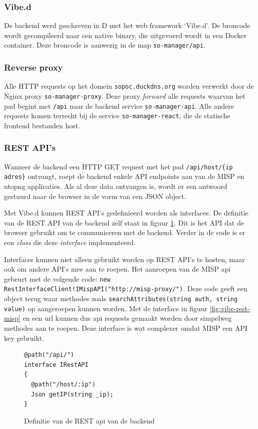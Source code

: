 \documentclass[a4paper,12pt]{report}
\begin{document}
\subsubsection{Vibe.d}
De backend werd geschreven in D met het web framework `Vibe.d'.
De broncode wordt gecompileerd naar een native binary, die uitgevoerd wordt in een Docker container.
Deze broncode is aanwezig in de map \lstinline|so-manager/api|.

\subsubsection{Reverse proxy}
Alle HTTP requests op het domein \lstinline|sopoc.duckdns.org| worden verwerkt door de Nginx proxy \lstinline|so-manager-proxy|.
Deze proxy \emph{forward} alle requests waarvan het pad begint met \lstinline|/api| naar de backend service \lstinline|so-manager-api|.
Alle andere requests komen terrecht bij de service \lstinline|so-manager-react|, die de statische frontend bestanden host.

\subsubsection{REST API's}
Wanneer de backend een HTTP GET request met het pad \lstinline|/api/host/{ip adres}| ontvangt, roept de backend enkele API endpoints aan van de MISP en ntopng applicaties.
Als al deze data ontvangen is, wordt er een antwoord gestuurd naar de browser in de vorm van een JSON object.

Met Vibe.d kunnen REST API's gedefinieerd worden als interfaces.
De definitie van de REST API van de backend zelf staat in figuur \ref{fig:vibe-rest-server}.
Dit is het API dat de browser gebruikt om te communiceren met de backend.
Verder in de code is er een \emph{class} die deze \emph{interface} implementeerd.

Interfaces kunnen niet alleen gebruikt worden op REST API's te hosten, maar ook om andere API's mee aan te roepen.
Het aanroepen van de MISP api gebeurt met de volgende code: \lstinline|new RestInterfaceClient!IMispAPI("http://misp-proxy/")|.
Deze code geeft een object terug waar methodes zoals \lstinline|searchAttributes(string auth, string value)| op aangeroepen kunnen worden.
Met de interface in figuur \ref{fig:vibe-rest-misp} en een url kunnen dus api requests gemaakt worden door simpelweg methodes aan te roepen.
Deze interface is wat complexer omdat MISP een API key gebruikt.

\begin{figure}[H]
  \begin{lstlisting}
@path("/api/")
interface IRestAPI
{
  @path("/host/:ip")
  Json getIP(string _ip);
}
  \end{lstlisting}
  \caption{Definitie van de REST api van de backend}
  \label{fig:vibe-rest-server}
\end{figure}
\end{document}
